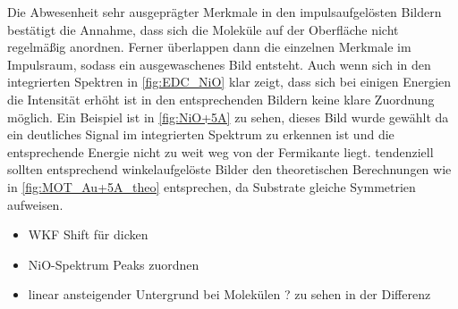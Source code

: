         Die Abwesenheit sehr ausgeprägter Merkmale in den impulsaufgelösten Bildern bestätigt die Annahme, dass sich die Moleküle auf der Oberfläche nicht regelmäßig anordnen.
        Ferner überlappen dann die einzelnen Merkmale im Impulsraum, sodass ein ausgewaschenes Bild entsteht.
        Auch wenn sich in den integrierten Spektren in \autoref{fig:EDC_NiO} klar zeigt, dass sich bei einigen Energien die Intensität erhöht ist in den entsprechenden Bildern keine klare Zuordnung möglich.
        Ein Beispiel ist in \autoref{fig:NiO+5A} zu sehen, dieses Bild wurde gewählt da ein deutliches Signal im integrierten Spektrum zu erkennen ist und die entsprechende Energie nicht zu weit weg von der Fermikante liegt.
        tendenziell sollten entsprechend winkelaufgelöste Bilder den theoretischen Berechnungen wie in \autoref{fig:MOT_Au+5A_theo} entsprechen, da Substrate gleiche Symmetrien aufweisen.
        \begin{itemize}
            \item WKF Shift für dicken
            \item NiO-Spektrum Peaks zuordnen
            \item linear ansteigender Untergrund bei Molekülen ? zu sehen in der Differenz
        \end{itemize}



